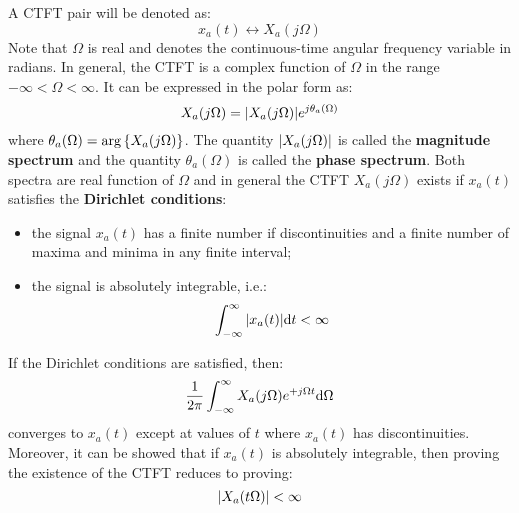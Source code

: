 \documentclass[../../main/main.tex]{subfiles}
\begin{document}
A CTFT pair will be denoted as:
\begin{equation}
    x_{a}(t)
    \longleftrightarrow
    X_{a}(j\Omega)
    \label{eq:L08_S04_2}
\end{equation}
Note that \( \Omega \) is real and denotes the continuous-time angular frequency variable in radians. In general, the CTFT is a complex function of \( \Omega \) in the range \( -\infty < \Omega < \infty \). It can be expressed in the polar form as:
\begin{equation}
    X_{a}(j\Omega)
    =
    \abs{X_{a}(j\Omega)} e^{j\theta_{a}(\Omega)}
    \label{eq:L08_S05_1}
\end{equation}
where \( \theta_{a}(\Omega) = \arg\qty{X_{a}(j\Omega)} \).
The quantity \( \abs{X_{a}(j\Omega)} \) is called the \textbf{magnitude spectrum} and the quantity \( \theta_{a}(\Omega) \) is called the \textbf{phase spectrum}. Both spectra are real function of \( \Omega \) and in general the CTFT \( X_{a}(j\Omega) \) exists if \( x_{a}(t) \) satisfies the \textbf{Dirichlet conditions}:
\begin{itemize}
    \item the signal \( x_a(t) \) has a finite number if discontinuities and a finite number of maxima and minima in any finite interval;
    \item the signal is absolutely integrable, i.e.:
    \begin{equation}
        \int_{-\infty}^{\infty} \abs{x_{a}(t)} \mathrm{d}{t}
        <
        \infty
        \label{eq:L08_S07_1}
    \end{equation}
\end{itemize}
If the Dirichlet conditions are satisfied, then:
\begin{equation}
    \frac{1}{2\pi} \int_{-\infty}^{\infty} X_{a}(j\Omega) e^{+j\Omega t} \mathrm{d}{\Omega}
    \label{eq:L08_S08_1}
\end{equation}
converges to \( x_{a}(t) \) except at values of \( t \) where \( x_{a}(t) \) has discontinuities. Moreover, it can be showed that if \( x_{a}(t) \) is absolutely integrable, then proving the existence of the CTFT reduces to proving:
\begin{equation}
    \abs{X_{a}(t\Omega)}
    <
    \infty
    \label{eq:L08_S08_2}
\end{equation}
\end{document}
